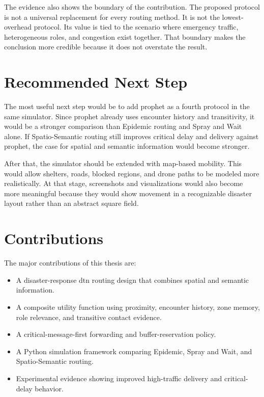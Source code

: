 The evidence also shows the boundary of the contribution. The proposed protocol is not a universal replacement for every routing method. It is not the lowest-overhead protocol. Its value is tied to the scenario where emergency traffic, heterogeneous roles, and congestion exist together. That boundary makes the conclusion more credible because it does not overstate the result.

\section{Recommended Next Step}
The most useful next step would be to add \ac{prophet} as a fourth protocol in the same simulator. Since \ac{prophet} already uses encounter history and transitivity, it would be a stronger comparison than Epidemic routing and Spray and Wait alone. If Spatio-Semantic routing still improves critical delay and delivery against \ac{prophet}, the case for spatial and semantic information would become stronger.

After that, the simulator should be extended with map-based mobility. This would allow shelters, roads, blocked regions, and drone paths to be modeled more realistically. At that stage, screenshots and visualizations would also become more meaningful because they would show movement in a recognizable disaster layout rather than an abstract square field.

\section*{Contributions}
The major contributions of this thesis are:

\begin{itemize}
	\item A disaster-response \ac{dtn} routing design that combines spatial and semantic information.
	\item A composite utility function using proximity, encounter history, zone memory, role relevance, and transitive contact evidence.
	\item A critical-message-first forwarding and buffer-reservation policy.
	\item A Python simulation framework comparing Epidemic, Spray and Wait, and Spatio-Semantic routing.
	\item Experimental evidence showing improved high-traffic delivery and critical-delay behavior.
\end{itemize}
